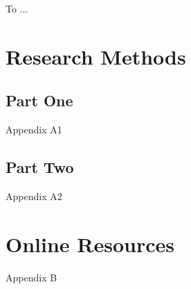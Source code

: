 \documentclass[sigconf,usenames,dvipsnames,svgnames,table]{acmart}
\begin{document}
\begin{acks}
To ...
\end{acks}




\appendix

\section{Research Methods}

\subsection{Part One}

Appendix A1

\subsection{Part Two}

Appendix A2

\section{Online Resources}

Appendix B
\end{document}

